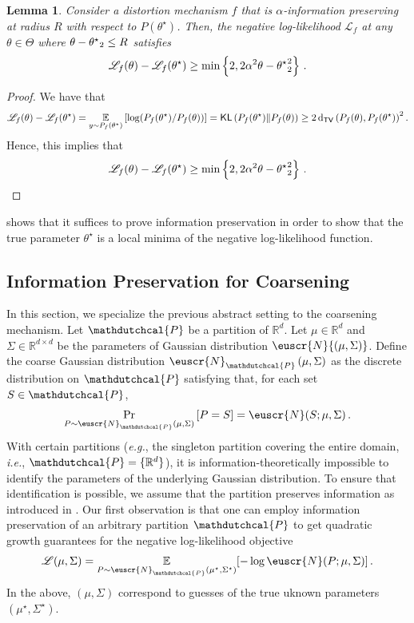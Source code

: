 \documentclass[11pt,letterpaper]{article}
\theoremstyle{plain}
\newtheorem{lemma}[theorem]{Lemma}
\theoremstyle{definition}
\theoremstyle{remark}
\newcommand{\inbrace}[1]{\ensuremath{\left\{#1\right\}}}
\newcommand{\inparen}[1]{\ensuremath{\left(#1\right)}}
\newcommand{\insquare}[1]{\ensuremath{\left[#1\right]}}
\let\norm\relax
\newcommand{\norm}[1]{\ensuremath{\left\lVert #1 \right\rVert}}
\newcommand{\R}{\mathbb{R}}
\newcommand{\E}{\operatornamewithlimits{\mathbb{E}}}
\newcommand{\tv}[2]{\operatorname{d}_{\mathsf{TV}}{\inparen{#1,#2}}}
\newcommand{\kl}[2]{\operatornamewithlimits{\mathsf{KL}}{\inparen{#1\|#2}}}
\newcommand{\customcal}[1]{\euscr{#1}}
\newcommand{\cN}{\customcal{N}}
\newcommand{\eg}{\emph{e.g.}}
\newcommand{\ie}{\emph{i.e.}}
\newcommand{\negLL}{\ensuremath{\mathscr{L}}}
\newcommand{\hypo}[1]{\mathdutchcal{#1}}
\newcommand{\hyL}{\hypo{L}}
\newcommand{\hyP}{\hypo{P}}
\newcommand{\normal}[2]{\cN{\inparen{#1,#2}}}
\newcommand{\coarseNormal}[3]{\cN_{#3}\inparen{#1,#2}}
\renewcommand{\hyL}{\negLL}
\begin{document}
{    \begin{lemma}\label{lem:model:informationPreservingImpliesGrowth}
    Consider a distortion mechanism $f$ that is {$\alpha$}-information preserving at radius $R$ with respect to $P(\theta^\star)$. Then, the negative log-likelihood $\hyL_f$ at any $\theta \in \Theta$ where $\norm{\theta-\theta^\star}_2\leq R$ satisfies
    \[
    \hyL_f(\theta)-
    \hyL_f(\theta^\star)
    \geq 
    \min\inbrace{2, 2\alpha^2 \norm{\theta - \theta^\star}_2^2}\,.
    \]
    \end{lemma}
    \begin{proof}
    We have that
    \[
    \hyL_f(\theta)-
    \hyL_f(\theta^\star)
    =
    \E_{y \sim P_f(\theta^\star)}
    \insquare{
    \log(P_f(\theta^\star) / P_f(\theta))
    }
    = \kl{P_f(\theta^\star)}{P_f(\theta)}
    \geq 
    2 \tv{P_f(\theta)}{P_f(\theta^\star)}^2 
    \,.
    \]
    Hence, this implies that
    \[
    \hyL_f(\theta)-
    \hyL_f(\theta^\star)
    \geq  
    \min\inbrace{2, 2\alpha^2 \norm{\theta - \theta^\star}_2^2} 
    \,. \qedhere
    \]
    \end{proof}
     shows that it suffices to prove information preservation
    in order to show that the true parameter $\theta^\star$ is a local minima of the negative log-likelihood function.
    
    \subsection{Information Preservation for Coarsening}
    \label{sec:info-pres-coarse}
    In this section, we specialize the previous abstract setting to the coarsening mechanism.
        Let $\hyP$ be a partition of $\R^d$.
        Let $\mu\in\R^d$ and $\Sigma\in \R^{d\times d}$ be the parameters of Gaussian distribution $\normal{\mu}{\Sigma}$.
        Define the coarse Gaussian distribution $\coarseNormal{\mu}{\Sigma}{\hyP}$ as the discrete distribution on $\hyP$ satisfying that, for each set $S \in \hyP$, 
        \[
            \Pr_{P \sim \coarseNormal{\mu}{\Sigma}{\hyP}}\insquare{P= S}
            =
            \cN(S ;\mu,\Sigma)\,.
        \]
        With certain partitions (\eg{}, the singleton partition covering the entire domain, \ie{}, $\hyP = \{\R^d\}$), it is information-theoretically impossible to identify the parameters of the underlying Gaussian distribution.
        To ensure that identification is possible, we assume that the partition preserves information as introduced in . Our first observation is that one can employ information preservation of an arbitrary partition $\hyP$ to get quadratic growth guarantees for the negative log-likelihood objective
        \begin{equation}
        \label{eq:NLL}
        \hyL(\mu, \Sigma) = \E_{P \sim \coarseNormal{\mu^\star}{\Sigma^\star}{\hyP}}[- \log \cN(P; \mu, \Sigma)] \,.
        \end{equation}
        In the above, $(\mu, \Sigma)$ correspond to guesses of the true uknown parameters $(\mu^\star, \Sigma^\star).$

}
\end{document}
